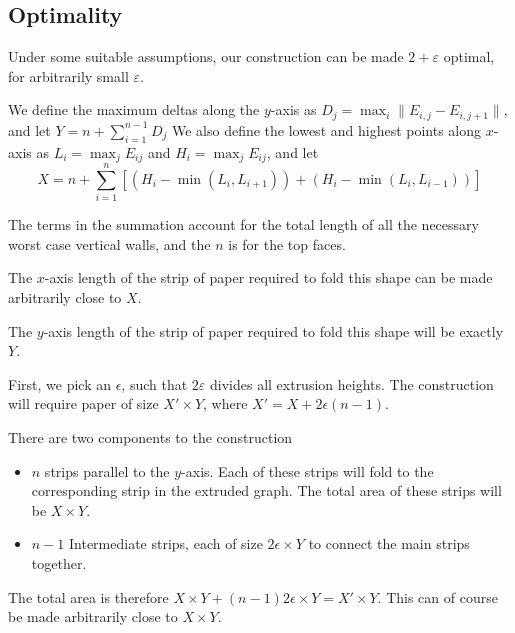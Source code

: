 \subsection{Optimality}
\label{sec:optimality}

Under some suitable assumptions, our construction can be made $2+\varepsilon$ optimal,
for arbitrarily small $\varepsilon$.

We define the maximum deltas along the $y$-axis as $D_j = \max_i{\|E_{i,j}-E_{i,j+1}\|}$,
and let $Y = n + \sum_{i=1}^{n-1} D_j$
We also define the lowest and highest points along $x$-axis as
$L_i = \max_j E_{ij}$ and $H_i = \max_j E_{ij}$, and let
$$X = n + \sum\limits_{i=1}^n \left[(H_i-\min(L_i,L_{i+1})) + (H_i-\min(L_i,L_{i-1}))\right]$$

The terms in the summation account for the total length of all the necessary worst case vertical walls,
and the $n$ is for the top faces.

\begin{claim}
The $x$-axis length of the strip of paper required to fold this shape can be made arbitrarily close to $X$.
\end{claim}
\begin{claim}
The $y$-axis length of the strip of paper required to fold this shape will be exactly $Y$.
\end{claim}

First, we pick an $\epsilon$, such that $2\varepsilon$ divides all extrusion heights.
The construction will require paper of size $X'\times Y$, where $X' = X + 2\epsilon(n-1)$.

There are two components to the construction
\begin{itemize}
	\item $n$ strips parallel to the $y$-axis. Each of these strips will fold to the corresponding strip in the extruded graph. The total area of these strips will be $X\times Y$.
    \item $n-1$ Intermediate strips, each of size $2\epsilon\times Y$ to connect the main strips together.
\end{itemize}
The total area is therefore $X\times Y + (n-1)2\epsilon\times Y = X'\times Y$. This can of course be made arbitrarily close to $X\times Y$.

